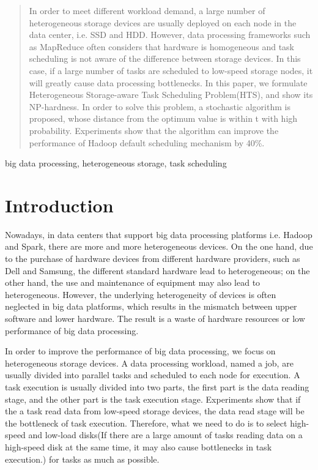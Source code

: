 \documentclass[conference]{IEEEtran}
\begin{document}
\begin{abstract}
In order to meet different workload demand, a large number of heterogeneous storage devices are usually deployed on each node in the data center, i.e. SSD and HDD. However, data processing frameworks such as MapReduce often considers that hardware is homogeneous and task scheduling is not aware of the difference between storage devices. In this case, if a large number of tasks are scheduled to low-speed storage nodes, it will greatly cause data processing bottlenecks. In this paper, we formulate Heterogeneous Storage-aware Task Scheduling Problem(HTS), and show its NP-hardness. In order to solve this problem, a stochastic algorithm is proposed, whose distance from the optimum value is within t with high probability. Experiments show that the algorithm can improve the performance of Hadoop default scheduling mechanism by 40\%.
\end{abstract}

\begin{IEEEkeywords}
big data processing, heterogeneous storage, task scheduling
\end{IEEEkeywords}

\section{Introduction}

Nowadays, in data centers that support big data processing platforms i.e. Hadoop\cite{b14} and Spark\cite{b15}, there are more and more heterogeneous devices. On the one hand, due to the purchase of hardware devices from different hardware providers, such as Dell\cite{b16} and Samsung\cite{b17}, the different standard hardware  lead to heterogeneous; on the other hand, the use and maintenance of equipment may also lead to heterogeneous. However, the underlying heterogeneity of devices is often neglected in big data platforms, which results in the mismatch between upper software and lower hardware. The result is a waste of hardware resources or low performance of big data processing.

In order to improve the performance of big data processing, we focus on heterogeneous storage devices. A data processing workload, named a job, are usually divided into parallel tasks and scheduled to each node for execution. A task execution is usually divided into two parts, the first part is the data reading stage, and the other part is the task execution stage. Experiments show that if the a task read data from low-speed storage devices, the data read stage will be the bottleneck of task execution. Therefore, what we need to do is to select high-speed and low-load disks(If there are a large amount of tasks reading data on a high-speed disk at the same time, it may also cause bottlenecks in task execution.) for tasks as much as possible.
\end{document}
